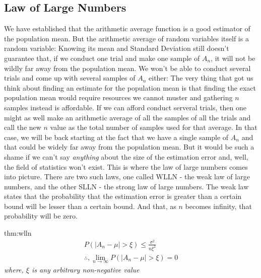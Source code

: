 \subsection{Law of Large Numbers}
We have established that the arithmetic average function is a good estimator of the population mean. But the arithmetic average of random variables itself is a random variable: Knowing its mean and Standard Deviation still doesn't guarantee that, if we conduct one trial and make one sample of $A_n$, it will not be wildly far away from the population mean. We won't be able to conduct several trials and come up with several samples of $A_n$ either: The very thing that got us think about finding an estimate for the population mean is that finding the exact population mean would require resources we cannot muster and gathering $n$ samples instead is affordable. If we can afford conduct serveral trials, then one might as well make an arithmetic average of all the samples of all the trials and call the new $n$ value as the total number of samples used for that average. In that case, we will be back starting at the fact that we have a single sample of $A_n$ and that could be widely far away from the population mean. But it would be such a shame if we can't say \emph{anything} about the size of the estimation error and, well, the field of statistics won't exist. This is where the law of large numbers comes into picture. There are two such laws, one called WLLN - the weak law of large numbers, and the other SLLN - the strong law of large numbers. The weak law states that the probability that the estimation error is greater than a certain bound will be lesser than a certain bound. And that, as $n$ becomes infinity, that probability will be zero. \\

	\begin{theo}{thm:wlln} 
	\begin{align*}
	P(|A_n-\mu| > \xi) \leq \frac{\sigma^2}{n\xi^2} \\
	\therefore, \lim_{n\to\infty} P(|A_n-\mu| > \xi) = 0 
	\end{align*}
	\emph{where, $\xi$ is any arbitrary non-negative value}
	\end{theo}

